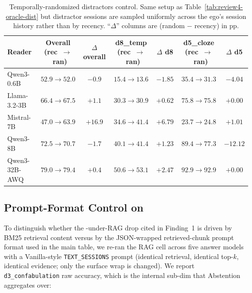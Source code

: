 \begin{table}[h]
\centering
\small
\caption{Temporally-randomized distractors control. Same setup as Table~\ref{tab:review4-oracle-dist} but distractor sessions are sampled uniformly across the ego's session history rather than by recency. ``$\Delta$'' columns are (random $-$ recency) in pp.}
\label{tab:review4-oracle-dist-random}
\begin{tabular}{l c c c c c c}
\toprule
Reader & Overall (rec~$\to$~ran) & $\Delta$ overall & d8\_temp (rec~$\to$~ran) & $\Delta$ d8 & d5\_cloze (rec~$\to$~ran) & $\Delta$ d5 \\
\midrule
Qwen3-0.6B    & $52.9 \to 52.0$ & $-0.9$ & $15.4 \to 13.6$ & $-1.85$ & $35.4 \to 31.3$ & $-4.04$ \\
Llama-3.2-3B  & $66.4 \to 67.5$ & $+1.1$ & $30.3 \to 30.9$ & $+0.62$ & $75.8 \to 75.8$ & $+0.00$ \\
Mistral-7B    & $47.0 \to 63.9$ & $\mathbf{+16.9}$ & $34.6 \to 41.4$ & $+6.79$ & $23.7 \to 24.8$ & $+1.01$ \\
Qwen3-8B      & $72.5 \to 70.7$ & $-1.7$ & $40.1 \to 41.4$ & $+1.23$ & $89.4 \to 77.3$ & $\mathbf{-12.12}$ \\
Qwen3-32B-AWQ & $79.0 \to 79.4$ & $+0.4$ & $50.6 \to 53.1$ & $+2.47$ & $92.9 \to 92.9$ & $+0.00$ \\
\bottomrule
\end{tabular}
\end{table}

\subsection{Prompt-Format Control on \DFiveID}
\label{app:review5-rag-prompt}

To distinguish whether the \DFiveID-under-RAG drop cited in Finding~1 is driven by BM25 retrieval content versus by the JSON-wrapped retrieved-chunk prompt format used in the main table, we re-ran the RAG cell across five answer models with a Vanilla-style \texttt{TEXT\_SESSIONS} prompt (identical retrieval, identical top-$k$, identical evidence; only the surface wrap is changed). We report \texttt{d3\_confabulation} raw accuracy, which is the internal sub-dim that \DFiveID Abstention aggregates over:

